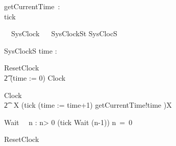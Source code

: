 
\begin{circus}
  \circchannel getCurrentTime~:~\nat\\
  \circchannel tick
\end{circus}


\begin{circus}%
  \circprocess\ ~SysClock ~\circdef~\circbegin
  \circstate SysClockSt  SysClocS
\end{circus}
\begin{schema}{SysClockS}
 time : \nat
\end{schema}
\begin{circusaction}
  ResetClock ~\circdef~
  \\\t2  (time := 0) \circseq Clock\\
\end{circusaction}
\begin{circusaction}
  Clock ~\circdef~
  \\\t2  \circmu~X \circspot  (tick \then (time := time+1) \interleave getCurrentTime!time \then \Skip)\circseq X
\end{circusaction}
\begin{circusaction}
  Wait~\circdef~ \circvar n : \nat \circspot
   \circif n> 0 \circthen (tick \then Wait (n-1))
   \circelse n~=~0 \circthen \Skip
   \circfi\\
\end{circusaction}
\begin{circus}
  \circspot ResetClock
  \circend
\end{circus}
